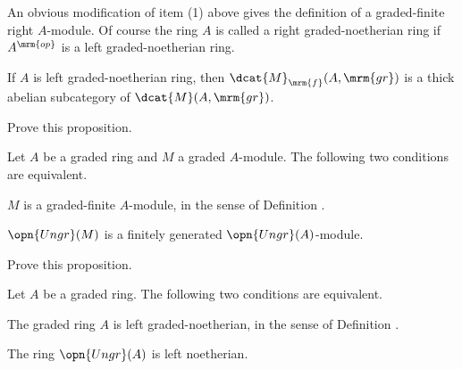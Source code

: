 An obvious modification of item (1) above gives the definition of a 
graded-finite  right $A$-module. Of course the ring $A$ is called a right 
graded-noetherian  ring if $A^{\mrm{op}}$ is a left graded-noetherian  ring.

\begin{prop} \label{prop:4260}
If $A$ is left graded-noetherian ring, then $\dcat{M}_{\mrm{f}}(A, 
\mrm{gr})$ is a thick abelian subcategory of $\dcat{M}(A, \mrm{gr})$. 
\end{prop}

\begin{exer} \label{exer:4261}
Prove this proposition. 
\end{exer}

\begin{prop} \label{prop:3745}
Let $A$ be a graded ring and $M$ a graded $A$-module. 
The following two conditions are equivalent.
\begin{itemize}
 $M$ is a graded-finite  $A$-module, in the sense of Definition 
.

 $\opn{Ungr}(M)$ is a finitely generated $\opn{Ungr}(A)$-module. 
\end{itemize}
\end{prop}

\begin{exer} \label{exer:3745}
Prove this proposition. 
\end{exer}

\begin{thm} \label{thm:4245}
Let $A$ be a graded ring. The following two conditions are equivalent.
\begin{itemize}
 The graded ring $A$ is left graded-noetherian, in the sense of 
Definition .

 The ring $\opn{Ungr}(A)$ is left noetherian.  
\end{itemize}
\end{thm}


